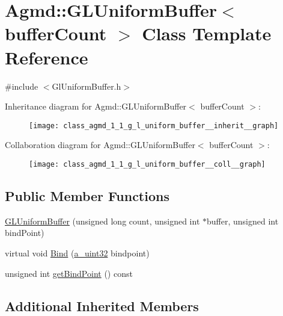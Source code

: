\hypertarget{class_agmd_1_1_g_l_uniform_buffer}{\section{Agmd\+:\+:G\+L\+Uniform\+Buffer$<$ buffer\+Count $>$ Class Template Reference}
\label{class_agmd_1_1_g_l_uniform_buffer}
}


{\ttfamily \#include $<$Gl\+Uniform\+Buffer.\+h$>$}



Inheritance diagram for Agmd\+:\+:G\+L\+Uniform\+Buffer$<$ buffer\+Count $>$\+:\nopagebreak
\begin{figure}[H]
\begin{center}
\leavevmode
\texttt{[image: class\_agmd\_1\_1\_g\_l\_uniform\_buffer\_\_inherit\_\_graph]}
\end{center}
\end{figure}


Collaboration diagram for Agmd\+:\+:G\+L\+Uniform\+Buffer$<$ buffer\+Count $>$\+:\nopagebreak
\begin{figure}[H]
\begin{center}
\leavevmode
\texttt{[image: class\_agmd\_1\_1\_g\_l\_uniform\_buffer\_\_coll\_\_graph]}
\end{center}
\end{figure}
\subsection*{Public Member Functions}
\begin{DoxyCompactItemize}
\item 
\hyperlink{class_agmd_1_1_g_l_uniform_buffer_a81c56eeb43e5f7761221a64dd07d3998}{G\+L\+Uniform\+Buffer} (unsigned long count, unsigned int $\ast$buffer, unsigned int bind\+Point)
\item 
virtual void \hyperlink{class_agmd_1_1_g_l_uniform_buffer_a3eb59228ab1366d6f802559d0e372aba}{Bind} (\hyperlink{_common_defines_8h_a964296f9770051b9e4807b1f180dd416}{a\+\_\+uint32} bindpoint)
\item 
unsigned int \hyperlink{class_agmd_1_1_g_l_uniform_buffer_a8fb28ebefdb8572b79ff018349ebcde9}{get\+Bind\+Point} () const 
\end{DoxyCompactItemize}
\subsection*{Additional Inherited Members}


